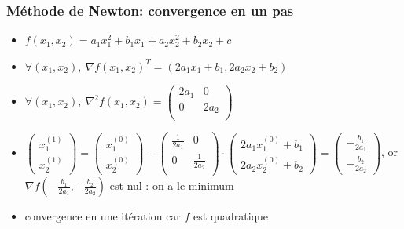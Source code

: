\begin{frame}
  \frametitle{Méthode de Newton: convergence en un pas}

  \begin{itemize}
  \item $f(x_1,x_2) = a_1x_1^2 + b_1x_1 + a_2x_2^2 + b_2x_2 + c$
  \item 
    $\forall (x_1,x_2), \ {\nabla f}(x_1,x_2)^T = (2a_1x_1 + b_1,2a_2x_2 + b_2)$
  \item 
  $ \forall (x_1,x_2), \ \nabla^2f(x_1,x_2) =
  \left(\begin{array}{cc}
    2a_1 & 0 \\
    0 & 2a_2 \\
  \end{array}
  \right)
  $
  \end{itemize}

  \begin{itemize}
  \item $\left( \begin{array}{c} x_1^{(1)} \\ x_2^{(1)} \end{array} \right ) =
    \left( \begin{array}{c} x_1^{(0)} \\ x_2^{(0)} \end{array} \right ) -
  \left(\begin{array}{cc} \frac{1}{2a_1} & 0 \\ 0 & \frac{1}{2a_2} \\ \end{array} \right) \cdot
  \left( \begin{array}{c} 2a_1x_1^{(0)} + b_1 \\ 2a_2x_2^{(0)} + b_2 \end{array} \right ) =
  \left( \begin{array}{c} -\frac{b_1}{2a_1} \\ -\frac{b_2}{2a_2} \end{array} \right ) $, or
  ${\nabla f}(-\frac{b_1}{2a_1}, -\frac{b_2}{2a_2})$ est nul : on a le minimum
  \item convergence en une itération car $f$ est quadratique
  \end{itemize}
  
\end{frame}

